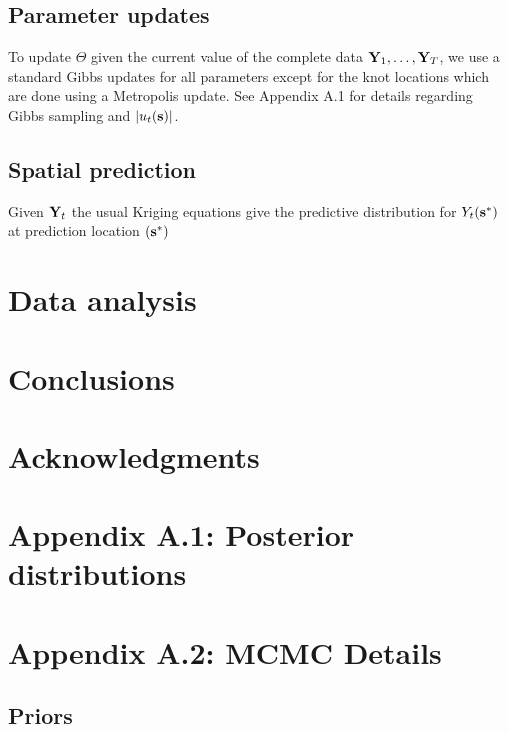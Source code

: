 \documentclass[11pt]{article}
\begin{document}
\subsection{Parameter updates}\label{s:params}
To update $\Theta$ given the current value of the complete data $\mbox{\bf Y}_1, \ldots, \mbox{\bf Y}_T$, we use a standard Gibbs updates for all parameters except for the knot locations which are done using a Metropolis update.
See Appendix A.1 for details regarding Gibbs sampling and $|u_t(\mbox{\bf s})|$.

\subsection{Spatial prediction}\label{s:pred}
Given $\mbox{\bf Y}_t$ the usual Kriging equations give the predictive distribution for $Y_t(\mbox{\bf s}^*)$ at prediction location $(\mbox{\bf s}^*)$


\section{Data analysis}\label{s:analysis}


\section{Conclusions}\label{s:con}

\section*{Acknowledgments}

\section*{Appendix A.1: Posterior distributions}




\section*{Appendix A.2: MCMC Details}

\subsection*{Priors}





\end{document}

